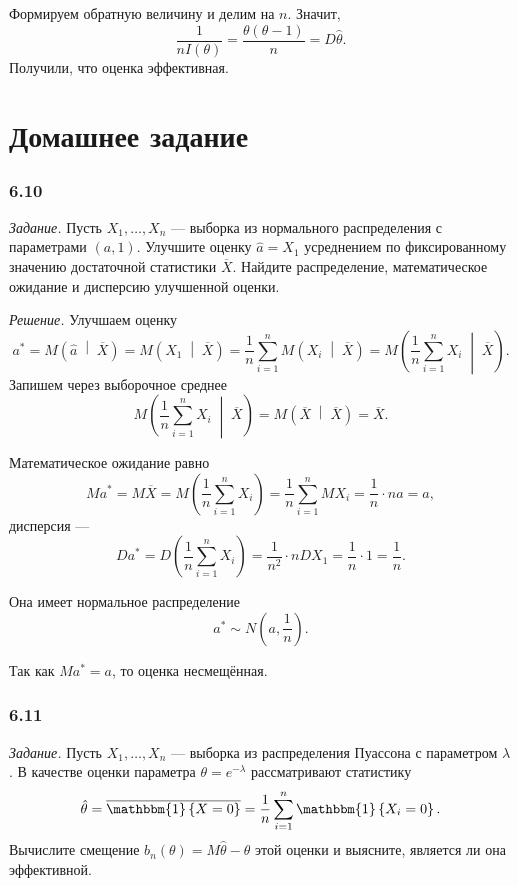 Формируем обратную величину и делим на $n$.
Значит,
$$ \frac{1}{nI \left( \theta \right) } =
  \frac{ \theta \left( \theta - 1 \right) }{n} =
  D \hat{ \theta }.$$
Получили, что оценка эффективная.

\section*{Домашнее задание}

\subsubsection*{6.10}

\textit{Задание.}
Пусть $X_1, \dotsc, X_n$ ---
выборка из нормального распределения с параметрами $ \left( a, 1 \right) $.
Улучшите оценку $ \hat{a} = X_1$ усреднением по фиксированному значению достаточной
статистики $ \overline{X}$.
Найдите распределение, математическое ожидание и дисперсию улучшенной оценки.

\textit{Решение.} Улучшаем оценку
$$a^* =
  M \left( \hat{a} \; \middle| \; \overline{X} \right) =
  M \left( X_1 \; \middle| \; \overline{X} \right) =
  \frac{1}{n} \sum \limits_{i = 1}^n M \left( X_i \; \middle| \; \overline{X} \right) =
  M \left( \frac{1}{n} \sum \limits_{i = 1}^n X_i \; \middle| \; \overline{X} \right).$$
Запишем через выборочное среднее
$$M \left( \frac{1}{n} \sum \limits_{i = 1}^n X_i \; \middle| \; \overline{X} \right) =
  M \left( \overline{X} \; \middle| \; \overline{X} \right) =
  \overline{X}.$$

Математическое ожидание равно
$$Ma^* =
  M \overline{X} =
  M \left( \frac{1}{n} \sum \limits_{i = 1}^n X_i \right) =
  \frac{1}{n} \sum \limits_{i = 1}^n MX_i =
  \frac{1}{n} \cdot na =
  a,$$
дисперсия ---
$$Da^* =
  D \left( \frac{1}{n} \sum \limits_{i = 1}^n X_i \right) =
  \frac{1}{n^2} \cdot n DX_1 =
  \frac{1}{n} \cdot 1 =
  \frac{1}{n}.$$

Она имеет нормальное распределение
$$a^* \sim
  N \left( a, \frac{1}{n} \right).$$

Так как $Ma^* = a$, то оценка несмещённая.

\subsubsection*{6.11}

\textit{Задание.}
Пусть $X_1, \dotsc, X_n$ --- выборка из распределения Пуассона с параметром $ \lambda $.
В качестве оценки параметра $ \theta = e^{- \lambda }$ рассматривают статистику
$$ \hat{ \theta } =
  \overline{ \mathbbm{1} \left\{ X = 0 \right\} } =
  \frac{1}{n} \sum \limits_{i = 1}^n \mathbbm{1} \left\{ X_i = 0 \right\}.$$
Вычислите смещение $b_n \left( \theta \right) = M \hat{ \theta } - \theta $ этой оценки и выясните,
является ли она эффективной.

